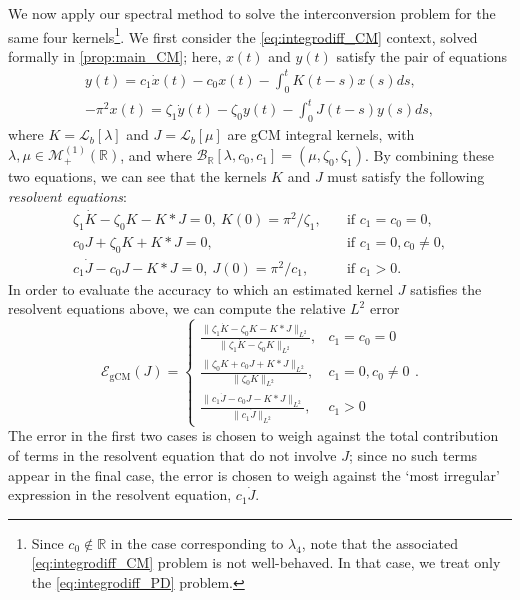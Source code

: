 \documentclass{cams-l} %
\newcommand{\dave}[1]{#1}\newcommand{\davebegin}{}\newcommand{\daveend}{}\newcommand{\george}[1]{#1}
\newcommand{\RR}{\mathbb R}
\newcommand{\cL}{\mathcal L}
\newcommand{\cM}{\mathcal M}
\newcommand{\cB}{\mathcal B}
\newcommand{\cE}{\mathcal E}
\theoremstyle{definition}
\theoremstyle{remark}
\numberwithin{equation}{section}
\begin{document}
We now apply our spectral method to solve the interconversion problem for the same four kernels\footnote{Since $c_0\notin\RR$ in the case corresponding to $\lambda_4$, note that the associated \ref{eq:integrodiff_CM} problem is not well-behaved. In that case, we treat only the \ref{eq:integrodiff_PD} problem.}.
\dave{We first consider the \ref{eq:integrodiff_CM} context, solved formally in \cref{prop:main_CM}}; here, $x(t)$ and $y(t)$ satisfy the pair of equations
\begin{equation*}
    \begin{gathered}
        y(t) = c_1\dot{x}(t) - c_0x(t) - \int_0^t K(t-s)x(s)ds,\\ -\pi^2x(t) = \zeta_1\dot{y}(t) - \zeta_0y(t) - \int_0^t J(t-s)y(s)ds,
    \end{gathered}
\end{equation*}
where $K = \cL_b[\lambda]$ and $J=\cL_b[\mu]$ are gCM integral kernels, with $\lambda,\mu\in\cM_+^{(1)}(\RR)$, and where $\cB_\RR[\lambda,c_0,c_1] = (\mu,\zeta_0,\zeta_1)$. By combining these two equations, we can see that the kernels $K$ and $J$ must satisfy the following \emph{resolvent equations}:
\begin{equation}\label{eq:resolvent_cm_detailed}
\begin{aligned}
    \zeta_1\dot{K} - \zeta_0K - K * J = 0, \ K(0) = \pi^2/\zeta_1, \quad &\text{if } c_1 = c_0 = 0,\\
     c_0J + \zeta_0K + K * J = 0,  \quad &\text{if } c_1 = 0, c_0 \neq 0,\\
    c_1\dot{J} - c_0J - K * J = 0, \ J(0) = \pi^2/c_1, \quad &\text{if } c_1 > 0.
\end{aligned}
\end{equation}
In order to evaluate the accuracy to which an estimated kernel $J$ satisfies the resolvent equations above, we can compute the relative $L^2$ error
\begin{equation}
    \cE_{\mathrm{gCM}}(J) = \begin{cases} \frac{\|\zeta_1\dot{K} - \zeta_0K - K * J\|_{L^2}}{\|\zeta_1\dot{K} - \zeta_0K\|_{L^2}}, & c_1 = c_0 = 0\\ \frac{\|\zeta_0K + c_0J + K * J\|_{L^2}}{\|\zeta_0K\|_{L^2}}, & c_1 = 0, c_0 \neq 0\\ \frac{\|c_1\dot{J} - c_0J - K * J\|_{L^2}}{\|c_1\dot{J}\|_{L^2}}, & c_1 > 0\end{cases}.
\end{equation}
The error in the first two cases is chosen to weigh against the total contribution of terms in the resolvent equation that do not involve $J$; since no such terms appear in the final case, the error is chosen to weigh against the `most irregular' expression in the resolvent equation, $c_1\dot{J}$.
\end{document}
